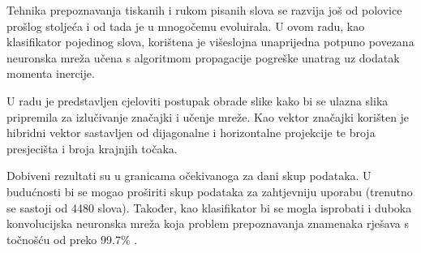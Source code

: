 Tehnika prepoznavanja tiskanih i rukom pisanih slova se razvija još od polovice prošlog stoljeća i od tada je u mnogočemu evoluirala. U ovom radu, kao klasifikator pojedinog slova, korištena je višeslojna unaprijedna potpuno povezana neuronska mreža učena s algoritmom propagacije pogreške unatrag uz dodatak momenta inercije.

U radu je predstavljen cjeloviti postupak obrade slike kako bi se ulazna slika pripremila za izlučivanje značajki i učenje mreže. Kao vektor značajki korišten je hibridni vektor sastavljen od dijagonalne i horizontalne projekcije te broja presjecišta i broja krajnjih točaka.

Dobiveni rezultati su u granicama očekivanoga za dani skup podataka. U budućnosti bi se mogao proširiti skup podataka za zahtjevniju uporabu (trenutno se sastoji od 4480 slova). Također, kao klasifikator bi se mogla isprobati i duboka konvolucijska neuronska mreža koja problem prepoznavanja znamenaka rješava s točnošću od preko $99.7$\% \citep{umjint}.